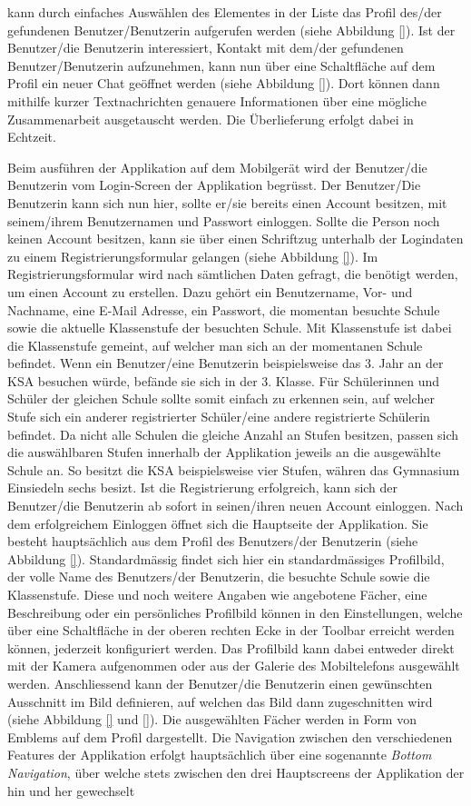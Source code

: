 \documentclass[../main.tex]{subfiles}
\begin{document}
kann durch einfaches Auswählen des Elementes in der Liste das Profil des/der gefundenen Benutzer/Benutzerin aufgerufen werden (siehe Abbildung \ref{}). Ist der Benutzer/die Benutzerin interessiert, Kontakt mit dem/der gefundenen Benutzer/Benutzerin aufzunehmen, kann nun über eine Schaltfläche auf dem Profil ein neuer Chat geöffnet werden (siehe Abbildung \ref{}). Dort können dann mithilfe kurzer Textnachrichten genauere Informationen über eine mögliche Zusammenarbeit ausgetauscht werden. Die Überlieferung erfolgt dabei in Echtzeit.

Beim ausführen der Applikation auf dem Mobilgerät wird der Benutzer/die Benutzerin vom Login-Screen der Applikation begrüsst. Der Benutzer/Die Benutzerin kann sich nun hier, sollte er/sie bereits einen Account besitzen, mit seinem/ihrem Benutzernamen und Passwort einloggen. Sollte die Person noch keinen Account besitzen, kann sie über einen Schriftzug unterhalb der Logindaten zu einem Registrierungsformular gelangen (siehe Abbildung \ref{}). Im Registrierungsformular wird nach sämtlichen Daten gefragt, die benötigt werden, um einen Account zu erstellen. Dazu gehört ein Benutzername, Vor- und Nachname, eine E-Mail Adresse, ein Passwort, die momentan besuchte Schule sowie die aktuelle Klassenstufe der besuchten Schule. Mit Klassenstufe ist dabei die Klassenstufe gemeint, auf welcher man sich an der momentanen Schule befindet. Wenn ein Benutzer/eine Benutzerin beispielsweise das 3. Jahr an der KSA besuchen würde, befände sie sich in der 3. Klasse. Für Schülerinnen und Schüler der gleichen Schule sollte somit einfach zu erkennen sein, auf welcher Stufe sich ein anderer registrierter Schüler/eine andere registrierte Schülerin befindet. Da nicht alle Schulen die gleiche Anzahl an Stufen besitzen, passen sich die auswählbaren Stufen innerhalb der Applikation jeweils an die ausgewählte Schule an. So besitzt die KSA beispielsweise vier Stufen, währen das Gymnasium Einsiedeln sechs besizt. Ist die Registrierung erfolgreich, kann sich der Benutzer/die Benutzerin ab sofort in seinen/ihren neuen Account einloggen. Nach dem erfolgreichem Einloggen öffnet sich die Hauptseite der Applikation. Sie besteht hauptsächlich aus dem Profil des Benutzers/der Benutzerin (siehe Abbildung \ref{}). Standardmässig findet sich hier ein standardmässiges Profilbild, der volle Name des Benutzers/der Benutzerin, die besuchte Schule sowie die Klassenstufe. Diese und noch weitere Angaben wie angebotene Fächer, eine Beschreibung oder ein persönliches Profilbild können in den Einstellungen, welche über eine Schaltfläche in der oberen rechten Ecke in der Toolbar erreicht werden können, jederzeit konfiguriert werden. Das Profilbild kann dabei entweder direkt mit der Kamera aufgenommen oder aus der Galerie des Mobiltelefons ausgewählt werden. Anschliessend kann der Benutzer/die Benutzerin einen gewünschten Ausschnitt im Bild definieren, auf welchen das Bild dann zugeschnitten wird (siehe Abbildung \ref{} und \ref{}). Die ausgewählten Fächer werden in Form von Emblems auf dem Profil dargestellt. Die Navigation zwischen den verschiedenen Features der Applikation erfolgt hauptsächlich über eine sogenannte \emph{Bottom Navigation}, über welche stets zwischen den drei Hauptscreens der Applikation der hin und her gewechselt 
\end{document}
